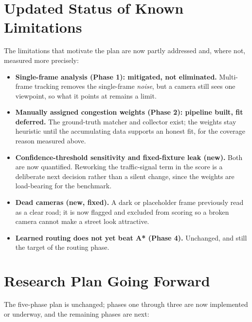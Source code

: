 \documentclass[12pt]{article}
\begin{document}
\section{Updated Status of Known Limitations}

The limitations that motivate the plan are now partly addressed and, where not,
measured more precisely:

\begin{itemize}[leftmargin=1.6em, itemsep=3pt]
  \item \textbf{Single-frame analysis (Phase 1): mitigated, not eliminated.}
    Multi-frame tracking removes the single-frame \emph{noise}, but a camera still
    sees one viewpoint, so what it points at remains a limit.
  \item \textbf{Manually assigned congestion weights (Phase 2): pipeline built,
    fit deferred.} The ground-truth matcher and collector exist; the weights stay
    heuristic until the accumulating data supports an honest fit, for the coverage
    reason measured above.
  \item \textbf{Confidence-threshold sensitivity and fixed-fixture leak (new).}
    Both are now quantified. Reworking the traffic-signal term in the score is a
    deliberate next decision rather than a silent change, since the weights are
    load-bearing for the benchmark.
  \item \textbf{Dead cameras (new, fixed).} A dark or placeholder frame previously
    read as a clear road; it is now flagged and excluded from scoring so a broken
    camera cannot make a street look attractive.
  \item \textbf{Learned routing does not yet beat A* (Phase 4).} Unchanged, and
    still the target of the routing phase.
\end{itemize}

\section{Research Plan Going Forward}

The five-phase plan is unchanged; phases one through three are now implemented or
underway, and the remaining phases are next:
\end{document}
